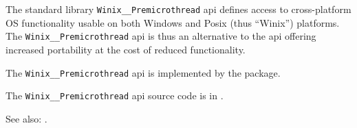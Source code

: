 
The standard library {\tt Winix\_\_Premicrothread} api defines access to cross-platform {\sc OS} functionality 
usable on both Windows and Posix (thus ``Winix'') platforms.  The {\tt Winix\_\_Premicrothread} api is thus an 
alternative to the  api offering increased portability at the 
cost of reduced functionality.

The {\tt Winix\_\_Premicrothread} api is implemented by the  package.

The {\tt Winix\_\_Premicrothread} api source code is in .

See also: .
